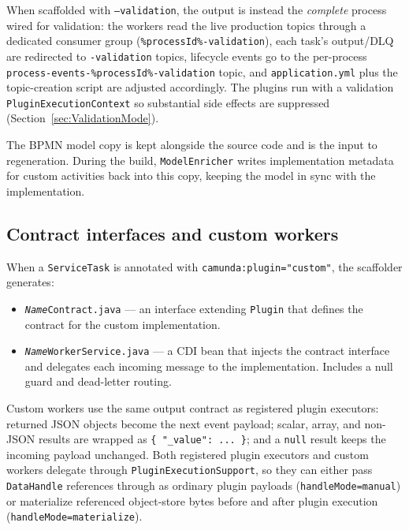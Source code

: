 When scaffolded with \texttt{--validation}, the output is instead the \emph{complete}
process wired for validation: the workers read the live production topics through a
dedicated consumer group (\texttt{\%processId\%-validation}), each task's output/DLQ are
redirected to \texttt{-validation} topics, lifecycle events go to the per-process
\texttt{process-events-\%processId\%-validation} topic, and \texttt{application.yml} plus the topic-creation
script are adjusted accordingly. The plugins run with a validation
\texttt{PluginExecutionContext} so substantial side effects are suppressed
(Section~\ref{sec:ValidationMode}).

The BPMN model copy is kept alongside the source code and is the input to
regeneration. During the build, \texttt{ModelEnricher} writes implementation
metadata for custom activities back into this copy, keeping the model in sync
with the implementation.

\subsection{Contract interfaces and custom workers}

When a \texttt{ServiceTask} is annotated with \texttt{camunda:plugin="custom"}, the
scaffolder generates:

\begin{itemize}
\item \texttt{\textit{Name}Contract.java} --- an interface extending \texttt{Plugin}
  that defines the contract for the custom implementation.
\item \texttt{\textit{Name}WorkerService.java} --- a CDI bean that injects the
  contract interface and delegates each incoming message to the implementation.
  Includes a null guard and dead-letter routing.
\end{itemize}

Custom workers use the same output contract as registered plugin executors:
returned JSON objects become the next event payload; scalar, array, and non-JSON
results are wrapped as \texttt{\{ "\_value": ... \}}; and a \texttt{null} result
keeps the incoming payload unchanged. Both registered plugin executors and custom
workers delegate through \texttt{PluginExecutionSupport}, so they can either pass
\texttt{DataHandle} references through as ordinary plugin payloads
(\texttt{handleMode=manual}) or materialize referenced object-store bytes before
and after plugin execution (\texttt{handleMode=materialize}).

